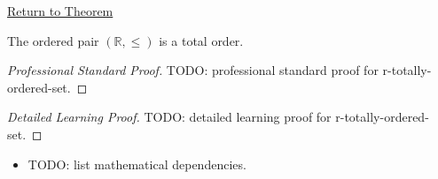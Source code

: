\newpage
{}
\label{prf:r-totally-ordered-set}

\begin{remark*}[Return]
\hyperref[thm:r-totally-ordered-set]{Return to Theorem}
\end{remark*}

\begin{theorem*}
The ordered pair $(\mathbb{R},\le)$ is a total order.
\end{theorem*}

\begin{proof}[Professional Standard Proof]
\LRAProofBodyStart
TODO: professional standard proof for r-totally-ordered-set.
\end{proof}

\begin{proof}[Detailed Learning Proof]
\LRAProofBodyStart
TODO: detailed learning proof for r-totally-ordered-set.
\end{proof}

\begin{remark*}
\end{remark*}

\begin{dependencies}
\begin{itemize}
  \item TODO: list mathematical dependencies.
\end{itemize}
\end{dependencies}

\clearpage
